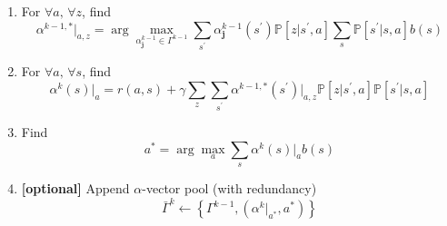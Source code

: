 \documentclass[a4paper,onecolumn]{article}
\begin{document}
\begin{enumerate}
    \item For $\forall a,\, \forall z$, find
	\begin{equation}
	    \alpha^{k-1,*}\big|_{a,z} =
		\arg\max_{\alpha^{k-1}_\textbf{j}\in\Gamma^{k-1}}
		\sum_{s^\prime} \alpha^{k-1}_\textbf{j}(s^\prime)
        \mathbb{P}\left[z\big| s^\prime, a\right]
        \sum_s\mathbb{P}\left[s^\prime\big|s,a\right]b(s)
	\end{equation}
	\item For $\forall a,\, \forall s$, find
	\begin{equation}
	    \alpha^k(s)\big|_a = r(a,s) + \gamma \sum_z
		\sum_{s^\prime} \alpha^{k-1,*}(s^\prime)\big|_{a,z}
		\mathbb{P}\left[z\big| s^\prime,
		a\right]\mathbb{P}\left[s^\prime\big|s,a\right]
	\end{equation}
	\item Find
	\begin{equation}
	    a^* = \arg\max_a \sum_s \alpha^k(s)\big|_a b(s)
	\end{equation}
	\item \textbf{[optional]} Append $\alpha$-vector pool (with redundancy)
	\begin{equation}
	    \bar{\Gamma}^{k} \leftarrow \left\{\Gamma^{k-1}, (\alpha^k\big|_{a^*},a^*)\right\}
	\end{equation}
\end{enumerate}
\end{document}
